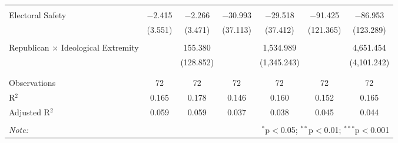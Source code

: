 \begin{tabular}{@{\extracolsep{5pt}}lcccccc}
  & & & & & & \\ 
 Electoral Safety & $-$2.415 & $-$2.266 & $-$30.993 & $-$29.518 & $-$91.425 & $-$86.953 \\ 
  & (3.551) & (3.471) & (37.113) & (37.412) & (121.365) & (123.289) \\ 
  & & & & & & \\ 
 Republican $\times$ Ideological Extremity &  & 155.380 &  & 1,534.989 &  & 4,651.454 \\ 
  &  & (128.852) &  & (1,345.243) &  & (4,101.242) \\ 
  & & & & & & \\ 
\hline \\[-1.8ex] 
Observations & 72 & 72 & 72 & 72 & 72 & 72 \\ 
R$^{2}$ & 0.165 & 0.178 & 0.146 & 0.160 & 0.152 & 0.165 \\ 
Adjusted R$^{2}$ & 0.059 & 0.059 & 0.037 & 0.038 & 0.045 & 0.044 \\ 
\hline 
\hline \\[-1.8ex] 
\textit{Note:}  & \multicolumn{6}{r}{$^{*}$p$<$0.05; $^{**}$p$<$0.01; $^{***}$p$<$0.001} \\ 
\end{tabular} 
